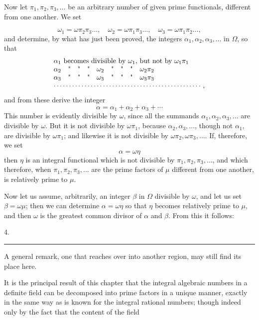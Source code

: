 Now let $\pi_1, \pi_2, \pi_3, \ldots$ be an arbitrary number of given prime functionals, different from one another. We set

\[
\omega_1 = \omega\pi_2\pi_3\ldots, \quad \omega_2 = \omega\pi_1\pi_3\ldots, \quad \omega_3 = \omega\pi_1\pi_2\ldots,
\]
and determine, by what has just been proved, the integers $\alpha_1, \alpha_2, \alpha_3, \ldots$ in $\Omega$, so that
\[
\begin{array}{l}
\alpha_1 \text{ becomes divisible by } \omega_1 \text{, but not by } \omega_1\pi_1\\
\alpha_2 \quad \text{\textquotedbl} \quad \text{\textquotedbl} \quad \text{\textquotedbl} \quad \omega_2 \quad \text{\textquotedbl} \quad \text{\textquotedbl} \quad \text{\textquotedbl} \quad \omega_2\pi_2\\
\alpha_3 \quad \text{\textquotedbl} \quad \text{\textquotedbl} \quad \text{\textquotedbl} \quad \omega_3 \quad \text{\textquotedbl} \quad \text{\textquotedbl} \quad \text{\textquotedbl} \quad \omega_3\pi_3\\
\cdots\cdots\cdots\cdots\cdots\cdots\cdots\cdots\cdots\cdots\cdots\cdots\cdots\cdots\cdots\cdots,
\end{array}
\]
and from these derive the integer
\[
\alpha = \alpha_1 + \alpha_2 + \alpha_3 + \cdots
\]
This number is evidently divisible by $\omega$, since all the summands $\alpha_1, \alpha_2, \alpha_3, \ldots$ are divisible by $\omega$. But it is not divisible by $\omega\pi_1$, because $\alpha_2, \alpha_3, \ldots$, though not $\alpha_1$, are divisible by $\omega\pi_1$; and likewise it is not divisible by $\omega\pi_2, \omega\pi_3, \ldots$. If, therefore, we set
\[
\alpha = \omega\eta
\]
then $\eta$ is an integral functional which is not divisible by $\pi_1, \pi_2, \pi_3, \ldots$, and which therefore, when $\pi_1, \pi_2, \pi_3, \ldots$ are the prime factors of $\mu$ different from one another, is relatively prime to $\mu$.

Now let us assume, arbitrarily, an integer $\beta$ in $\Omega$ divisible by $\omega$, and let us set $\beta = \omega\mu$; then we can determine $\alpha = \omega\eta$ so that $\eta$ becomes relatively prime to $\mu$, and then $\omega$ is the greatest common divisor of $\alpha$ and $\beta$. From this it follows:

4. 

\begin{center}
\rule{4cm}{0.4pt}
\end{center}

A general remark, one that reaches over into another region, may still find its place here.

It is the principal result of this chapter that the integral algebraic numbers in a definite field can be decomposed into prime factors in a unique manner, exactly in the same way as is known for the integral rational numbers; though indeed only by the fact that the content of the field
